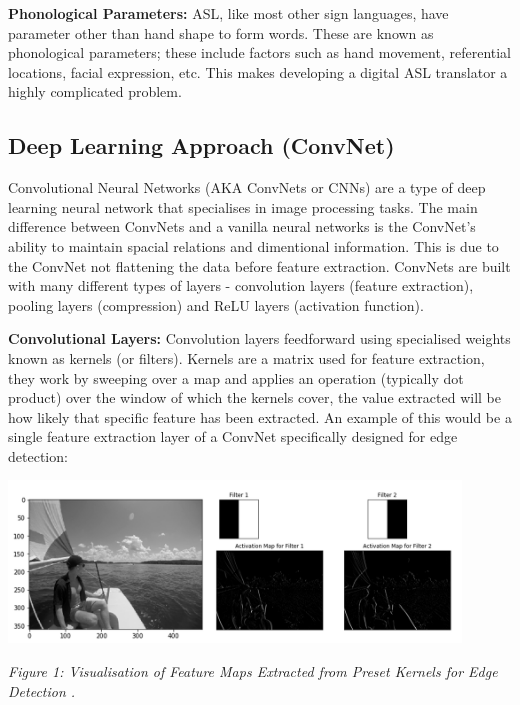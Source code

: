 \documentclass[11pt]{article}
\def\paraskip{\vskip 0.4cm}
\begin{document}
        \paraskip

        \noindent\textbf{Phonological Parameters:} ASL, like most other sign languages, have parameter other than hand shape to form words. These are known as phonological parameters; these include factors such as hand movement, referential locations, facial expression, etc. This makes developing a digital ASL translator a highly complicated problem. 


    \subsection{Deep Learning Approach (ConvNet)}
        Convolutional Neural Networks (AKA ConvNets or CNNs) are a type of deep learning neural network that specialises in image processing tasks. The main difference between ConvNets and a vanilla neural networks is the ConvNet's ability to maintain spacial relations and dimentional information. This is due to the ConvNet not flattening the data before feature extraction. ConvNets are built with many different types of layers - convolution layers (feature extraction), pooling layers (compression) and ReLU layers (activation function).

        \paraskip

        \noindent\textbf{Convolutional Layers: } Convolution layers feedforward using specialised weights known as kernels (or filters). Kernels are a matrix used for feature extraction, they work by sweeping over a map and applies an operation (typically dot product) over the window of which the kernels cover, the value extracted will be how likely that specific feature has been extracted. An example of this would be a single feature extraction layer of a ConvNet specifically designed for edge detection: 

        \begin{center}
            \includegraphics[width=12cm]{kernels.png}
            \\
            \raggedright \textit{
            Figure 1: Visualisation of Feature Maps Extracted from Preset Kernels for Edge Detection \cite{cnn goat}.
            }
        \end{center}
        
\end{document}
